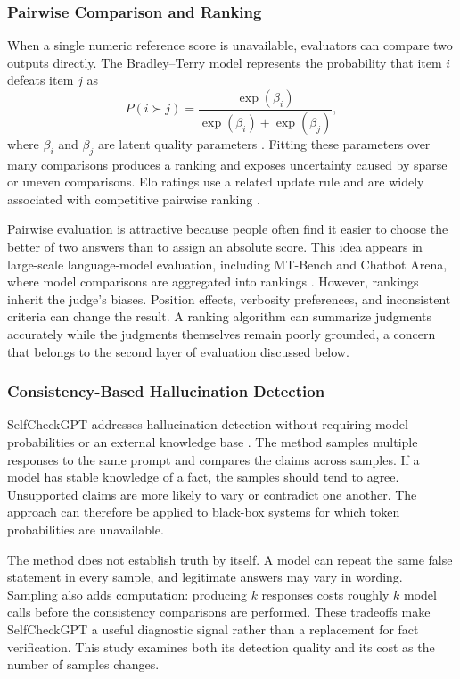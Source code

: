 \documentclass[conference]{IEEEtran}
\begin{document}
\subsubsection{Pairwise Comparison and Ranking}
When a single numeric reference score is unavailable, evaluators can compare two outputs directly. The Bradley--Terry model represents the probability that item $i$ defeats item $j$ as
\begin{equation}
P(i \succ j)=\frac{\exp(\beta_i)}{\exp(\beta_i)+\exp(\beta_j)},
\end{equation}
where $\beta_i$ and $\beta_j$ are latent quality parameters \cite{bradley1952rank}. Fitting these parameters over many comparisons produces a ranking and exposes uncertainty caused by sparse or uneven comparisons. Elo ratings use a related update rule and are widely associated with competitive pairwise ranking \cite{elo1978rating}.

Pairwise evaluation is attractive because people often find it easier to choose the better of two answers than to assign an absolute score. This idea appears in large-scale language-model evaluation, including MT-Bench and Chatbot Arena, where model comparisons are aggregated into rankings \cite{zheng2023judging}. However, rankings inherit the judge's biases. Position effects, verbosity preferences, and inconsistent criteria can change the result. A ranking algorithm can summarize judgments accurately while the judgments themselves remain poorly grounded, a concern that belongs to the second layer of evaluation discussed below.

\subsubsection{Consistency-Based Hallucination Detection}
SelfCheckGPT addresses hallucination detection without requiring model probabilities or an external knowledge base \cite{manakul2023selfcheckgpt}. The method samples multiple responses to the same prompt and compares the claims across samples. If a model has stable knowledge of a fact, the samples should tend to agree. Unsupported claims are more likely to vary or contradict one another. The approach can therefore be applied to black-box systems for which token probabilities are unavailable.

The method does not establish truth by itself. A model can repeat the same false statement in every sample, and legitimate answers may vary in wording. Sampling also adds computation: producing $k$ responses costs roughly $k$ model calls before the consistency comparisons are performed. These tradeoffs make SelfCheckGPT a useful diagnostic signal rather than a replacement for fact verification. This study examines both its detection quality and its cost as the number of samples changes.
\end{document}

